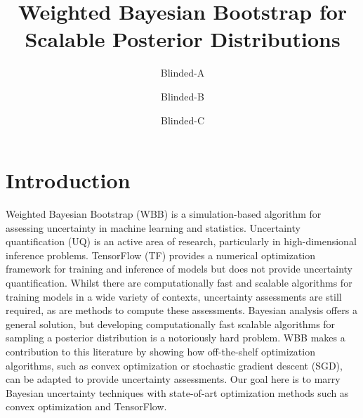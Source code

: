 \documentclass[12pt]{TD-CJS}
\begin{document}


\title[Weighted Bayesian Bootstrap]{Weighted Bayesian Bootstrap for Scalable Posterior Distributions }
\author{Blinded-A}
\author{Blinded-B}
\author{Blinded-C}


\makechaptertitle


\newpage

\section{Introduction}
Weighted Bayesian Bootstrap (WBB) is a simulation-based algorithm for assessing uncertainty in machine learning and statistics. Uncertainty quantification (UQ) is an active area of research, particularly in high-dimensional inference problems. TensorFlow (TF) provides a numerical optimization framework for training and inference of models but does not provide uncertainty quantification. Whilst there are computationally fast and scalable algorithms for training models in a wide variety of contexts, uncertainty assessments are still required, as are methods to compute these assessments.  Bayesian analysis offers a general solution, but developing computationally fast scalable algorithms for sampling a posterior distribution is a notoriously hard problem. WBB makes a contribution to this literature by showing how off-the-shelf optimization algorithms, such as convex optimization or stochastic gradient descent (SGD), can be adapted to provide uncertainty assessments. Our goal here is to marry Bayesian uncertainty techniques with state-of-art optimization methods such as convex optimization and TensorFlow.
 
\end{document}
